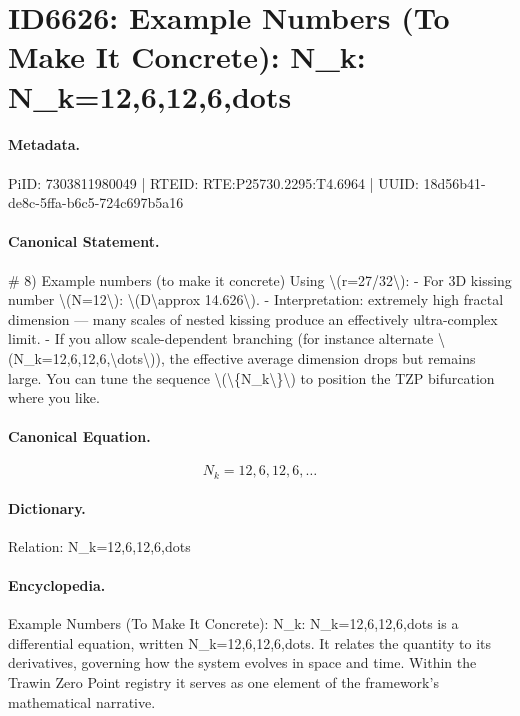 \section*{ID6626: Example Numbers (To Make It Concrete): N\_k: N\_k=12,6,12,6,dots}
\paragraph{Metadata.}
PiID: 7303811980049 | RTEID: RTE:P25730.2295:T4.6964 | UUID: 18d56b41-de8c-5ffa-b6c5-724c697b5a16

\paragraph{Canonical Statement.}
\# 8) Example numbers (to make it concrete) Using \textbackslash{}(r=27/32\textbackslash{}): - For 3D kissing number \textbackslash{}(N=12\textbackslash{}): \textbackslash{}(D\textbackslash{}approx 14.626\textbackslash{}). - Interpretation: extremely high fractal dimension — many scales of nested kissing produce an effectively ultra-complex limit. - If you allow scale-dependent branching (for instance alternate \textbackslash{}(N\_k=12,6,12,6,\textbackslash{}dots\textbackslash{})), the effective average dimension drops but remains large. You can tune the sequence \textbackslash{}(\textbackslash{}\{N\_k\textbackslash{}\}\textbackslash{}) to position the TZP bifurcation where you like.

\paragraph{Canonical Equation.}
\[
N_k=12,6,12,6,\dots
\]

\paragraph{Dictionary.}
Relation: N\_k=12,6,12,6,dots

\paragraph{Encyclopedia.}
Example Numbers (To Make It Concrete): N\_k: N\_k=12,6,12,6,dots is a differential equation, written N\_k=12,6,12,6,dots. It relates the quantity to its derivatives, governing how the system evolves in space and time. Within the Trawin Zero Point registry it serves as one element of the framework's mathematical narrative.
